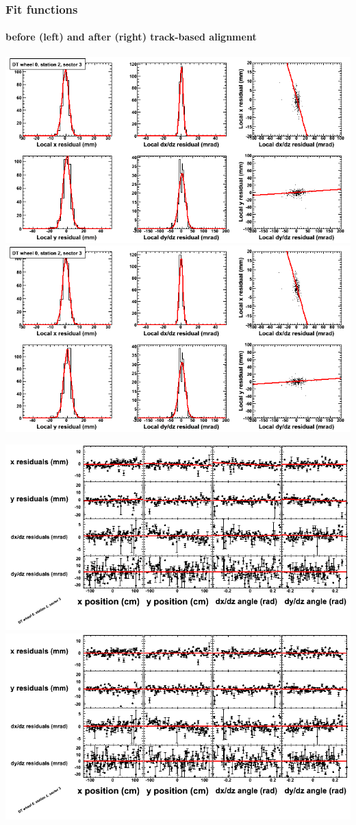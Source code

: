 \documentclass[compress]{beamer}
\begin{document}
\begin{frame}
\frametitle{Fit functions}
\framesubtitle{before (left) and after (right) track-based alignment}
\includegraphics[width=0.5\linewidth]{fitfunctions_re01/MBwhCst2sec03_bellcurves.png} \includegraphics[width=0.5\linewidth]{fitfunctions_re05/MBwhCst2sec03_bellcurves.png}

\includegraphics[width=0.5\linewidth]{fitfunctions_re01/MBwhCst2sec03_polynomials.png} \includegraphics[width=0.5\linewidth]{fitfunctions_re05/MBwhCst2sec03_polynomials.png}
\end{frame}
\end{document}
